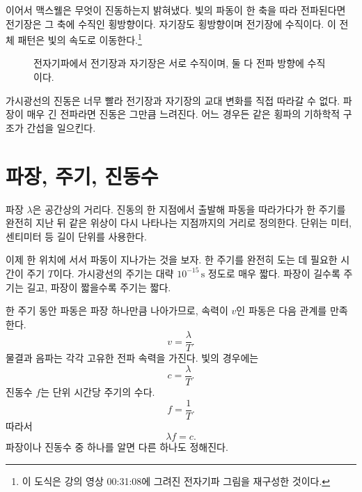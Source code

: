이어서 맥스웰은 무엇이 진동하는지 밝혀냈다. 빛의 파동이 한 축을 따라 전파된다면 전기장은 그 축에 수직인 횡방향이다. 자기장도 횡방향이며 전기장에 수직이다. 이 전체 패턴은 빛의 속도로 이동한다.\footnote{이 도식은 강의 영상 00:31:08에 그려진 전자기파 그림을 재구성한 것이다.}

\begin{figure}[h]\centering
{}\caption{전자기파에서 전기장과 자기장은 서로 수직이며, 둘 다 전파 방향에 수직이다.}\end{figure}

가시광선의 진동은 너무 빨라 전기장과 자기장의 교대 변화를 직접 따라갈 수 없다. 파장이 매우 긴 전파라면 진동은 그만큼 느려진다. 어느 경우든 같은 횡파의 기하학적 구조가 간섭을 일으킨다.

\section{파장, 주기, 진동수}

파장 \(\lambda\)은 공간상의 거리다. 진동의 한 지점에서 출발해 파동을 따라가다가 한 주기를 완전히 지난 뒤 같은 위상이 다시 나타나는 지점까지의 거리로 정의한다. 단위는 미터, 센티미터 등 길이 단위를 사용한다.

이제 한 위치에 서서 파동이 지나가는 것을 보자. 한 주기를 완전히 도는 데 필요한 시간이 주기 \(T\)이다. 가시광선의 주기는 대략 \(10^{-15}\,\mathrm{s}\) 정도로 매우 짧다. 파장이 길수록 주기는 길고, 파장이 짧을수록 주기는 짧다.

한 주기 동안 파동은 파장 하나만큼 나아가므로, 속력이 \(v\)인 파동은 다음 관계를 만족한다.
\begin{equation}
v=\frac{\lambda}{T}.
\end{equation}
물결과 음파는 각각 고유한 전파 속력을 가진다. 빛의 경우에는
\begin{equation}
c=\frac{\lambda}{T}.
\end{equation}
진동수 \(f\)는 단위 시간당 주기의 수다.
\begin{equation}
f=\frac{1}{T}.
\end{equation}
따라서
\begin{equation}
\lambda f=c.
\end{equation}
파장이나 진동수 중 하나를 알면 다른 하나도 정해진다.

